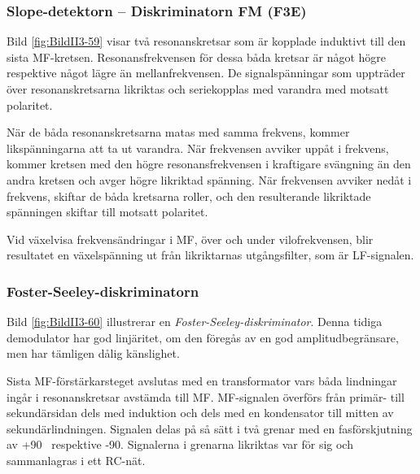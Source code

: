\subsubsection{Slope-detektorn -- Diskriminatorn FM (F3E)}


Bild \ref{fig:BildII3-59} visar två resonanskretsar som är kopplade induktivt
till den sista MF-kretsen.
Resonansfrekvensen för dessa båda kretsar är något högre respektive något lägre
än mellanfrekvensen.
De signalspänningar som uppträder över resonanskretsarna likriktas och
seriekopplas med varandra med motsatt polaritet.

När de båda resonanskretsarna matas med samma frekvens, kommer
likspänningarna att ta ut varandra.
När frekvensen avviker uppåt i frekvens, kommer kretsen med den högre
resonansfrekvensen i kraftigare svängning än den andra kretsen och avger högre
likriktad spänning.
När frekvensen avviker nedåt i frekvens, skiftar de båda kretsarna roller,
och den resulterande likriktade spänningen skiftar till motsatt polaritet.

Vid växelvisa frekvensändringar i MF, över och under vilofrekvensen, blir
resultatet en växelspänning ut från likriktarnas utgångsfilter, som är
LF-signalen.

\subsubsection{Foster-Seeley-diskriminatorn}


Bild \ref{fig:BildII3-60} illustrerar en \emph{Foster-Seeley-diskriminator}.
Denna tidiga demodulator har god linjäritet, om den föregås av en god
amplitudbegränsare, men har tämligen dålig känslighet.

Sista MF-förstärkarsteget avslutas med en transformator vars båda
lindningar ingår i resonanskretsar avstämda till MF.
MF-signalen överförs från primär- till sekundärsidan dels med induktion och dels
med en kondensator till mitten av sekundärlindningen.
Signalen delas på så sätt i två grenar med en fasförskjutning av +90\degree~
respektive -90\degree.
Signalerna i grenarna likriktas var för sig och sammanlagras i ett RC-nät.

